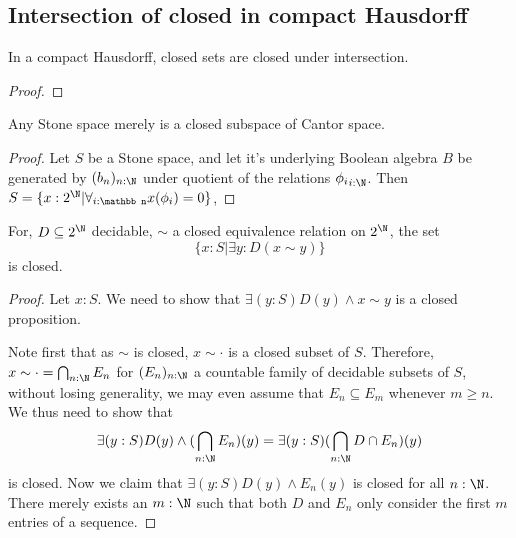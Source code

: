 \subsection{Intersection of closed in compact Hausdorff}

\begin{lemma}
  In a compact Hausdorff, closed sets are closed under intersection. 
\end{lemma}
\begin{proof}
  
\end{proof}



\begin{lemma}
  Any Stone space merely is a closed subspace of Cantor space. 
\end{lemma}
\begin{proof}
  Let $S$ be a Stone space, and let it's underlying Boolean algebra $B$ be generated by 
  $(b_n)_{n:\N}$ under quotient of the relations ${\phi_i}_{i:\N}$. 
  Then $S = \{ x: 2^\N | \forall_{i:\mathbb n} x(\phi_i) = 0\}$, 
\end{proof}


\begin{lemma}
  For, $D\subseteq 2^\N$ decidable, $\sim$ a closed equivalence relation on $2^\N$,
  the set $$\{x:S | \exists y : D (x\sim y)\}$$ is closed. 
\end{lemma}
\begin{proof}
  Let $x:S$. We need to show that $\exists (y:S) D(y) \wedge x \sim y$ is a closed proposition. 

  Note first that as $\sim $ is closed, $x \sim \cdot $ is a closed subset of $S$. 
  Therefore, $x\sim \cdot = \bigcap_{n:\N} E_n$ for $(E_n)_{n:\N}$ a
  countable family of decidable subsets of $S$, without losing generality, 
  we may even assume that $E_n \subseteq E_m$ whenever $m\geq n$. 
  We thus need to show that 
  $$
  \exists (y:S) D(y) \wedge (\bigcap_{n:\N} E_n)(y) 
  = 
  \exists (y:S) (\bigcap_{n:\N} D \cap  E_n)(y) 
  $$
  is closed. 
%
  Now we claim that 
  $\exists (y:S) D(y) \wedge E_n(y)$ is closed for all $n:\N$. 
  There merely exists an $m:\N$ such that both $D$ and $E_n$ only consider 
  the first $m$ entries of a sequence. 
  
\end{proof}



